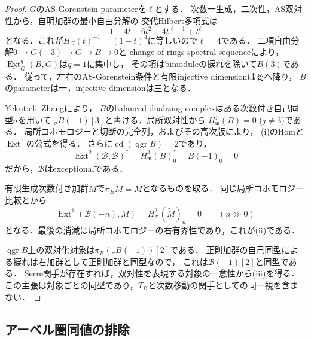\begin{proof}
$G$のAS-Gorenstein parameterを$\ell$とする．
次数一生成，二次性，AS双対性から，自明加群の最小自由分解の
交代Hilbert多項式は
\[
 1-4t+6t^2-4t^{\ell-1}+t^\ell
\]
となる．これが$H_G(t)^{-1}=(1-t)^4$に等しいので$\ell=4$である．
二項自由分解$0\to G(-3)\to G\to B\to0$と
change-of-rings spectral sequenceにより，
$\underline{\operatorname{Ext}}_G^q(B,G)$は$q=1$に集中し，
その項はbimoduleの捩れを除いて$B(3)$である．
従って，左右のAS-Gorenstein条件と有限injective dimensionは商へ降り，
$B$のparameterは一，injective dimensionは三となる．

Yekutieli--Zhang\cite[Theorem~4.2, Corollary~4.3]{YZ1997}により，
$B$のbalanced dualizing complexはある次数付き自己同型$\sigma$を用いて
${}_\sigma B(-1)[3]$と書ける．局所双対性から
$H^j_{\mathfrak m}(B)=0$ ($j\ne3$)である．
局所コホモロジーと切断の完全列，およびその高次版により，
(i)のHomと$\operatorname{Ext}^1$の公式を得る．
さらに$\operatorname{cd}(\operatorname{qgr}B)=2$であり，
\[
 \operatorname{Ext}^2(\mathcal B,\mathcal B)^*
 =H^3_{\mathfrak m}(B)_0^*
 =B(-1)_0=0
\]
だから，$\mathcal B$はexceptionalである．

有限生成次数付き加群$\widetilde M$で$\pi_B\widetilde M=M$となるものを取る．
同じ局所コホモロジー比較と\cite[Theorem~4.2(1)]{YZ1997}から
\[
 \operatorname{Ext}^1(\mathcal B(-n),M)
 =H^2_{\mathfrak m}(\widetilde M)_n=0\qquad(n\gg0)
\]
となる．最後の消滅は局所コホモロジーの右有界性であり，これが(ii)である．

$\operatorname{qgr}B$上の双対化対象は$\pi_B({}_\sigma B(-1))[2]$である．
正則加群の自己同型による捩れは右加群として正則加群と同型なので，
これは$\mathcal B(-1)[2]$と同型である．
Serre関手が存在すれば，双対性を表現する対象の一意性から(iii)を得る．
この主張は対象ごとの同型であり，$T_B$と次数移動の関手としての同一視を含まない．
\end{proof}

\subsection{アーベル圏同値の排除}


